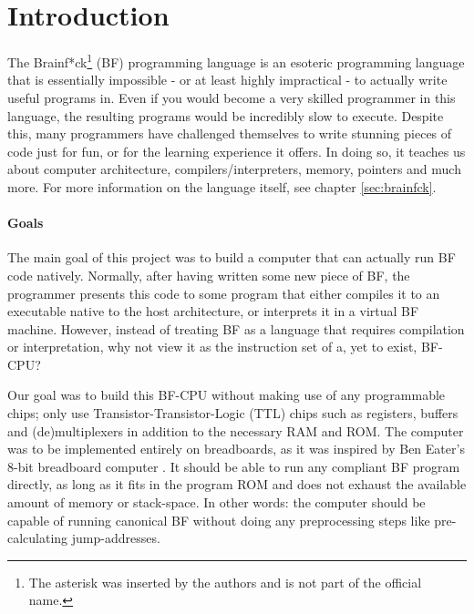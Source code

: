 \section{Introduction} \label{sec:introduction}
The Brainf*ck\footnote{The asterisk was inserted by the authors and is not part of the official name.} (BF) programming language is an esoteric programming language that is essentially impossible - or at least highly impractical - to actually write useful programs in. Even if you would become a very skilled programmer in this language, the resulting programs would be incredibly slow to execute. Despite this, many programmers have challenged themselves to write stunning pieces of code just for fun, or for the learning experience it offers. In doing so, it teaches us about computer architecture, compilers/interpreters, memory, pointers and much more. For more information on the language itself, see chapter \ref{sec:brainfck}.

\paragraph{Goals} The main goal of this project was to build a computer that can actually run BF code natively. Normally, after having written some new piece of BF, the programmer presents this code to some program that either compiles it to an executable native to the host architecture, or interprets it in a virtual BF machine. However, instead of treating BF as a language that requires compilation or interpretation, why not view it as the instruction set of a, yet to exist, BF-CPU?

Our goal was to build this BF-CPU without making use of any programmable chips; only use Transistor-Transistor-Logic (TTL) chips such as registers, buffers and (de)multiplexers in addition to the necessary RAM and ROM. The computer was to be implemented entirely on breadboards, as it was inspired by Ben Eater's 8-bit breadboard computer \cite{beneater}. It should be able to run any compliant BF program directly, as long as it fits in the program ROM and does not exhaust the available amount of memory or stack-space. In other words: the computer should be capable of running canonical BF without doing any preprocessing steps like pre-calculating jump-addresses.

